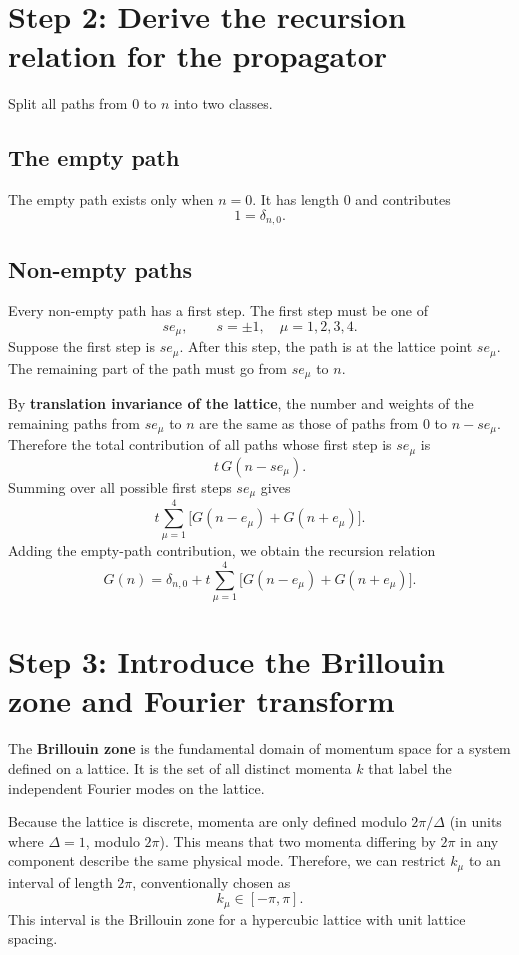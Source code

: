 \documentclass[12pt]{article}
\begin{document}
\section{Step 2: Derive the recursion relation for the propagator}

Split all paths from \(0\) to \(n\) into two classes.

\subsection{The empty path}
The empty path exists only when \(n=0\).  
It has length \(0\) and contributes
\[
1=\delta_{n,0}.
\]

\subsection{Non-empty paths}
Every non-empty path has a first step.  
The first step must be one of
\[
s e_\mu,\qquad s=\pm 1,\quad \mu=1,2,3,4.
\]
Suppose the first step is \(s e_\mu\).  
After this step, the path is at the lattice point \(s e_\mu\).  
The remaining part of the path must go from \(s e_\mu\) to \(n\).

By \textbf{translation invariance of the lattice}, the number and weights of the remaining paths from \(s e_\mu\) to \(n\) are the same as those of paths from \(0\) to \(n-s e_\mu\).  
Therefore the total contribution of all paths whose first step is \(s e_\mu\) is
\[
t\,G(n-s e_\mu).
\]
Summing over all possible first steps \(s e_\mu\) gives
\[
t\sum_{\mu=1}^4\bigl[G(n-e_\mu)+G(n+e_\mu)\bigr].
\]
Adding the empty-path contribution, we obtain the recursion relation
\begin{equation}
\boxed{
G(n)=\delta_{n,0}
+
t\sum_{\mu=1}^4\bigl[G(n-e_\mu)+G(n+e_\mu)\bigr].
}
\tag{2}
\end{equation}

\section{Step 3: Introduce the Brillouin zone and Fourier transform}

The \textbf{Brillouin zone} is the fundamental domain of momentum space for a system defined on a lattice. It is the set of all distinct momenta \(k\) that label the independent Fourier modes on the lattice.

Because the lattice is discrete, momenta are only defined modulo \(2\pi/\Delta\) (in units where \(\Delta=1\), modulo \(2\pi\)). This means that two momenta differing by \(2\pi\) in any component describe the same physical mode. Therefore, we can restrict \(k_\mu\) to an interval of length \(2\pi\), conventionally chosen as
\[
k_\mu\in[-\pi,\pi].
\]
This interval is the Brillouin zone for a hypercubic lattice with unit lattice spacing.
\end{document}
